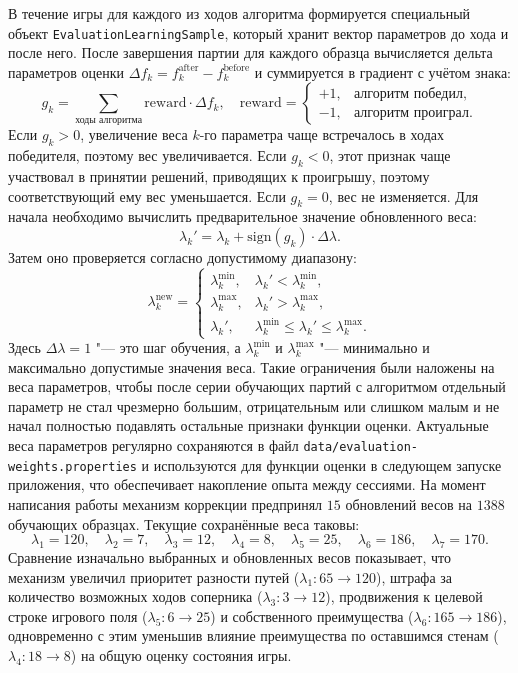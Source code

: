 \documentclass[a4paper,12pt]{diplom}
\renewcommand{\le}{\leqslant}
\begin{document}
В течение игры для каждого из ходов алгоритма формируется специальный объект \texttt{EvaluationLearningSample}, который хранит вектор параметров до хода и после него. После завершения партии для каждого образца вычисляется дельта параметров оценки $\Delta f_k = f_k^{\mathrm{after}} - f_k^{\mathrm{before}}$ и суммируется в градиент с учётом знака:
\begin{equation}
    g_k = \sum_{\text{ходы алгоритма}} \mathrm{reward} \cdot \Delta f_k, \quad \mathrm{reward} = \begin{cases} +1, & \text{алгоритм победил}, \\ -1, & \text{алгоритм проиграл.} \end{cases}
\end{equation}
Если $g_k > 0$, увеличение веса $k$-го параметра чаще встречалось в ходах победителя, поэтому вес увеличивается. Если $g_k < 0$, этот признак чаще участвовал в принятии решений, приводящих к проигрышу, поэтому соответствующий ему вес уменьшается. Если $g_k = 0$, вес не изменяется. Для начала необходимо вычислить предварительное значение обновленного веса:
\begin{equation}
    \lambda_k' = \lambda_k + \mathrm{sign}(g_k) \cdot \Delta\lambda.
\end{equation}
Затем оно проверяется согласно допустимому диапазону:
\begin{equation}
    \lambda_k^{\mathrm{new}} =
    \begin{cases}
        \lambda_k^{\min}, & \lambda_k' < \lambda_k^{\min}, \\
        \lambda_k^{\max}, & \lambda_k' > \lambda_k^{\max}, \\
        \lambda_k', & \lambda_k^{\min} \le \lambda_k' \le \lambda_k^{\max}.
    \end{cases}
\end{equation}
Здесь $\Delta\lambda = 1$ "--- это шаг обучения, а $\lambda_k^{\min}$ и $\lambda_k^{\max}$ "--- минимально и максимально допустимые значения веса. Такие ограничения были наложены на веса параметров, чтобы после серии обучающих партий с алгоритмом отдельный параметр не стал чрезмерно большим, отрицательным или слишком малым и не начал полностью подавлять остальные признаки функции оценки. Актуальные веса параметров регулярно сохраняются в файл \texttt{data/evaluation-weights.properties} и используются для функции оценки в следующем запуске приложения, что обеспечивает накопление опыта между сессиями. На момент написания работы механизм коррекции предпринял $15$ обновлений весов на $1388$ обучающих образцах. Текущие сохранённые веса таковы:
\[
\lambda_1 = 120,\quad \lambda_2 = 7,\quad \lambda_3 = 12,\quad \lambda_4 = 8,\quad \lambda_5 = 25,\quad \lambda_6 = 186,\quad \lambda_7 = 170.
\]
Сравнение изначально выбранных и обновленных весов показывает, что механизм увеличил приоритет разности путей ($\lambda_1: 65 \to 120$), штрафа за количество возможных ходов соперника ($\lambda_3: 3 \to 12$), продвижения к целевой строке игрового поля ($\lambda_5: 6 \to 25$) и собственного преимущества ($\lambda_6: 165 \to 186$), одновременно с этим уменьшив влияние преимущества по оставшимся стенам ($\lambda_4: 18 \to 8$) на общую оценку состояния игры.
\end{document}
